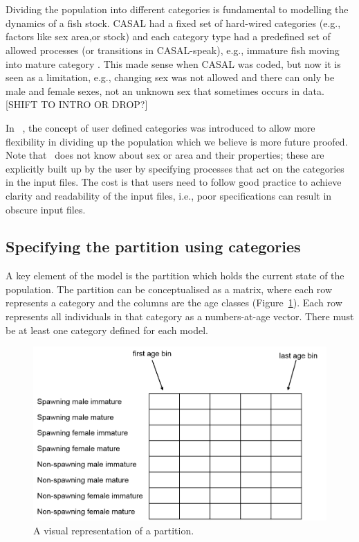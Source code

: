 \section{\label{sec:partition-categories-section}}

Dividing the population into different categories is fundamental to modelling the dynamics of a fish stock. CASAL had a fixed set of hard-wired categories (e.g., factors like sex area,or stock) and each category type had a predefined set of allowed processes (or transitions in CASAL-speak), e.g., immature fish moving into mature category \citep{1388}. This made sense when CASAL was coded, but now it is seen as a limitation, e.g., changing sex was not allowed and there can only be male and female sexes, not an unknown sex that sometimes occurs in data. [SHIFT TO INTRO OR DROP?]

In \CNAME~, the concept of user defined categories was introduced to allow more flexibility in dividing up the population which we believe is more future proofed. Note that \CNAME~does not know about sex or area and their properties; these are explicitly built up by the user by specifying processes that act on the categories in the input files. The cost is that users need to follow good practice to achieve clarity and readability of the input files, i.e., poor specifications can result in obscure input files.

\subsection{Specifying the partition using categories}
A key element of the model is the partition which  holds the current state of the population. The partition can be conceptualised as a matrix, where each row represents a category and the columns are the age classes (Figure~\ref{Fig:part}). Each row represents all individuals in that category as a numbers-at-age vector.  There must be at least one category defined for each model.


\begin{figure}[H]
	\centering
	\includegraphics[scale=0.4]{Figures/partition2.png}
		\caption{A visual representation of a partition.}\label{Fig:part}
\end{figure}

